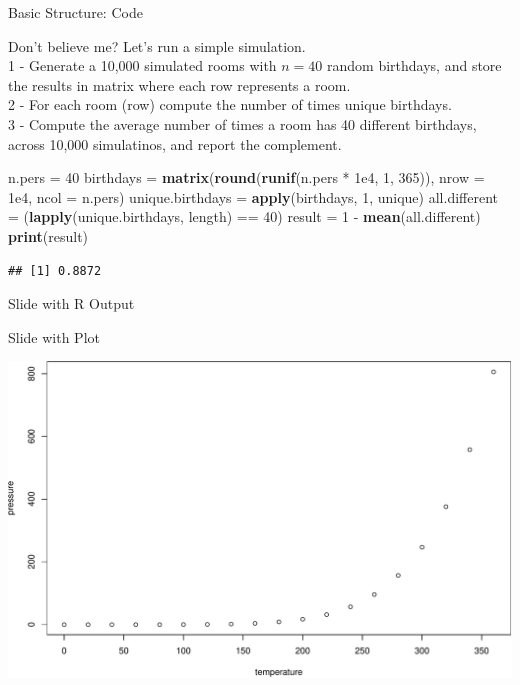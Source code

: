 \documentclass[ignorenonframetext,]{beamer}
\newenvironment{Shaded}{\begin{snugshade}}{\end{snugshade}}
\newcommand{\KeywordTok}[1]{\textcolor[rgb]{0.13,0.29,0.53}{\textbf{{#1}}}}
\newcommand{\DataTypeTok}[1]{\textcolor[rgb]{0.13,0.29,0.53}{{#1}}}
\newcommand{\DecValTok}[1]{\textcolor[rgb]{0.00,0.00,0.81}{{#1}}}
\newcommand{\FloatTok}[1]{\textcolor[rgb]{0.00,0.00,0.81}{{#1}}}
\newcommand{\StringTok}[1]{\textcolor[rgb]{0.31,0.60,0.02}{{#1}}}
\newcommand{\NormalTok}[1]{{#1}}
\begin{document}
\begin{frame}[fragile]{Basic Structure: Code}

Don't believe me? Let's run a simple simulation.\\
1 - Generate a 10,000 simulated rooms with \(n = 40\) random birthdays,
and store the results in matrix where each row represents a room.\\
2 - For each room (row) compute the number of times unique birthdays.\\
3 - Compute the average number of times a room has 40 different
birthdays, across 10,000 simulatinos, and report the complement.

\begin{Shaded}
\begin{Highlighting}[]
\NormalTok{n.pers =}\StringTok{ }\DecValTok{40}
\NormalTok{birthdays =}\StringTok{ }\KeywordTok{matrix}\NormalTok{(}\KeywordTok{round}\NormalTok{(}\KeywordTok{runif}\NormalTok{(n.pers *}\StringTok{ }\FloatTok{1e4}\NormalTok{, }\DecValTok{1}\NormalTok{, }\DecValTok{365}\NormalTok{)), }\DataTypeTok{nrow =} \FloatTok{1e4}\NormalTok{, }\DataTypeTok{ncol =} \NormalTok{n.pers)}
\NormalTok{unique.birthdays =}\StringTok{ }\KeywordTok{apply}\NormalTok{(birthdays, }\DecValTok{1}\NormalTok{, unique)}
\NormalTok{all.different =}\StringTok{ }\NormalTok{(}\KeywordTok{lapply}\NormalTok{(unique.birthdays, length) ==}\StringTok{ }\DecValTok{40}\NormalTok{)}
\NormalTok{result =}\StringTok{ }\DecValTok{1} \NormalTok{-}\StringTok{ }\KeywordTok{mean}\NormalTok{(all.different)}
\KeywordTok{print}\NormalTok{(result)}
\end{Highlighting}
\end{Shaded}

\begin{verbatim}
## [1] 0.8872
\end{verbatim}

\end{frame}

\begin{frame}{Slide with R Output}

\end{frame}

\begin{frame}{Slide with Plot}

\includegraphics{slides_w_beamer_files/figure-beamer/pressure-1.pdf}

\end{frame}
\end{document}
